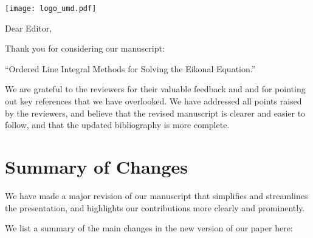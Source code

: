 \documentclass{article}
\begin{document}
\texttt{[image: logo\_umd.pdf]}

\vspace{5.5em}

Dear Editor,

\vspace{1.5em}

Thank you for considering our manuscript:
\vspace{1em}
\begin{center}
  ``Ordered Line Integral Methods for Solving the Eikonal Equation.''
\end{center}
\vspace{1em} We are grateful to the reviewers for their valuable
feedback and and for pointing out key references that we have
overlooked.  We have addressed all points raised by the reviewers, and
believe that the revised manuscript is clearer and easier to follow,
and that the updated bibliography is more complete.

\vspace{1em}

\section*{Summary of Changes}

We have made a major revision of our manuscript that simplifies and
streamlines the presentation, and highlights our contributions more
clearly and prominently.

We list a summary of the main changes in the new version of our paper
here:
\end{document}
